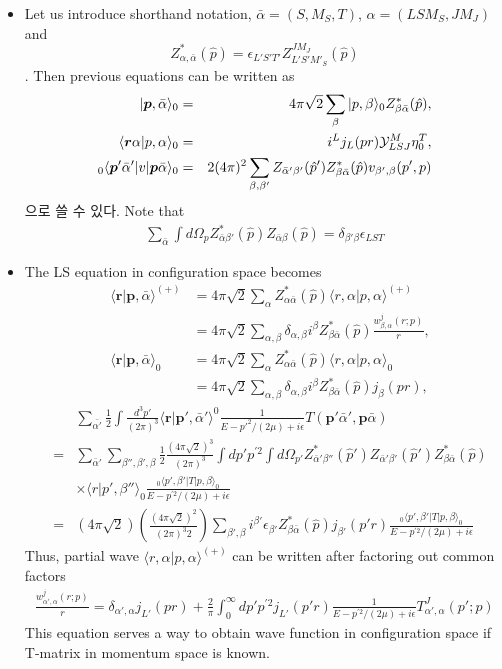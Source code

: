 \documentclass[10pt]{book}
\def\bm{\boldsymbol}
\newcommand{\bea}{\begin{eqnarray}}
\newcommand{\eea}{\end{eqnarray}}
\newcommand{\no}{\nonumber \\}
\def\vp{{\bm p}}
\def\vr{{\bm r}}
\def\la{\langle}
\def\ra{\rangle}
\begin{document}
\begin{itemize}
\item Let us introduce shorthand notation,
$\bar{\alpha}=(S,M_S,T)$, $\alpha=(L S M_S ,J M_J)$
and $$Z^*_{\alpha, \bar{\alpha}}(\hat{p})
=\epsilon_{L'S'T'}Z^{J M_J}_{L'S'M'_S}(\hat{p})$$
. Then previous equations can be written as
\bea
|\vp,\bar{\alpha}\ra_0&=&4\pi\sqrt{2}
     \sum_{\beta}|p,\beta\ra_0 Z^*_{\beta \bar{\alpha}}(\hat{p}),\no
\la \vr\alpha|p,\alpha\ra_0&=& i^L j_L(pr) {\cal Y}^M_{LSJ}\eta^T_0,\no
{}_0\la \vp'\bar{\alpha}'|v|\vp \bar{\alpha}\ra_0
&=&2 (4\pi)^2\sum_{\beta,\beta'}
  Z_{\bar{\alpha}'\beta'}(\hat{p}') Z^*_{\beta \bar{\alpha}}(\hat{p})
       v_{\beta',\beta}(p',p)     
\eea 
으로 쓸 수 있다. Note that
\bea
\sum_{\bar{\alpha}} \int d\Omega_{p} 
Z_{\bar{\alpha}\beta'}^*(\hat{p}) Z_{\bar{\alpha}\beta}(\hat{p})
=\delta_{\beta'\beta}\epsilon_{LST}
\eea
\item The LS equation in configuration space becomes
\bea
&\la\vr|\vp,\bar{\alpha}\ra^{(+)}&=4\pi\sqrt{2}\sum_{\alpha} Z^*_{\alpha\bar{\alpha}}(\hat{p}) \la r,\alpha|p,\alpha\ra^{(+)} \no
& & =4\pi\sqrt{2}\sum_{\alpha,\beta} \delta_{\alpha,\beta}
    i^{\beta} Z^*_{\beta \bar{\alpha}}(\hat{p}) 
    \frac{w^j_{\beta,\alpha}(r;p)}{r}  ,\no
&\la\vr|\vp,\bar{\alpha}\ra_0 &=4\pi\sqrt{2}\sum_{\alpha} Z^*_{\alpha\bar{\alpha}}(\hat{p}) \la r,\alpha|p,\alpha\ra_0 \no
& &=4\pi\sqrt{2}\sum_{\alpha,\beta} \delta_{\alpha,\beta}
    i^{\beta} Z^*_{\beta \bar{\alpha}}(\hat{p}) 
    j_{\beta}(pr),
\eea
\bea
& &\sum_{\bar{\alpha'}}\frac{1}{2}
 \int \frac{d^3p'}{(2\pi)^3}\la \vr|\vp',\bar{\alpha}'\ra^0
 \frac{1}{E-p'^2/(2\mu)+i\epsilon} T(\vp'\bar{\alpha}',\vp \bar{\alpha})\no
&=&\sum_{\bar{\alpha}'}\sum_{\beta'',\beta',\beta}
 \frac{1}{2}\frac{(4\pi\sqrt{2})^3}{(2\pi)^3}\int dp' p^{'2}\int d\Omega_{p'}
  Z^*_{\bar{\alpha}'\beta''}(\hat{p}')
 Z_{\bar{\alpha}'\beta'}(\hat{p}')Z_{\beta\bar{\alpha}}^*(\hat{p})
  \no & &\times
 \la r|p',\beta''\ra_0 \frac{{}_0\la p',\beta'|T|p,\beta\ra_0}{E-p^{'2}/(2\mu)+i\epsilon}\no
&=&(4\pi\sqrt{2})(\frac{(4\pi\sqrt{2})^2}{(2\pi)^3 2})
  \sum_{\beta',\beta} i^{\beta'}
  \epsilon_{\beta'} Z^*_{\beta\bar{\alpha}}(\hat{p})
  j_{\beta'}(p'r) \frac{{}_0\la p',\beta'|T|p,\beta\ra_0}{E-p^{'2}/(2\mu)+i\epsilon}
\eea
Thus, partial wave $\la r,\alpha|p,\alpha\ra^{(+)}$ can be written 
after factoring out common factors
\bea
\frac{w_{\alpha',\alpha}^j(r;p)}{r}
=\delta_{\alpha',\alpha}j_{L'}(pr)
 +\frac{2}{\pi}\int_0^\infty dp' p^{'2} j_{L'}(p'r)
 \frac{1}{E-p^{'2}/(2\mu)+i\epsilon} T^J_{\alpha',\alpha}(p';p)
\eea
This equation serves a way to obtain wave function
in configuration space if T-matrix in momentum space is known.

\end{itemize}
\end{document}

